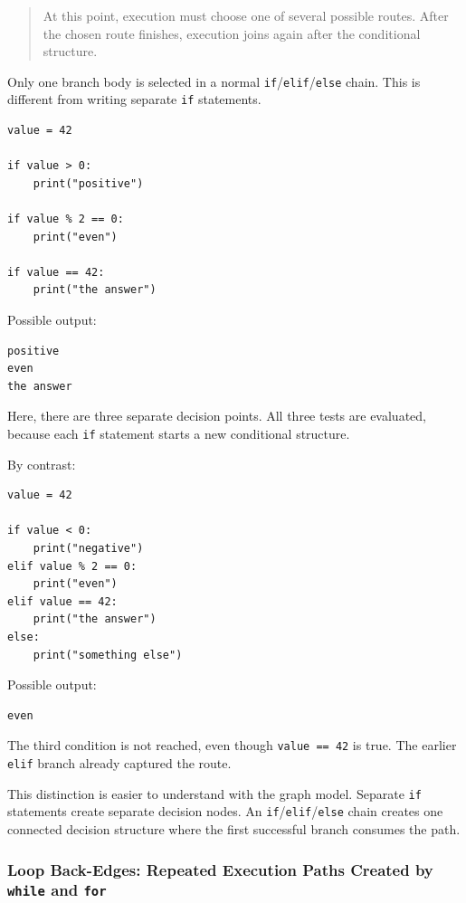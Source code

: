 \documentclass[a4paper,twoside]{report}
\begin{document}
\begin{quote}
At this point, execution must choose one of several possible routes. After the chosen route finishes, execution joins again after the conditional structure.
\end{quote}

Only one branch body is selected in a normal \texttt{if}/\texttt{elif}/\texttt{else} chain. This is different from writing separate \texttt{if} statements.

\begin{verbatim}
value = 42

if value > 0:
    print("positive")

if value % 2 == 0:
    print("even")

if value == 42:
    print("the answer")
\end{verbatim}

Possible output:

\begin{verbatim}
positive
even
the answer
\end{verbatim}

Here, there are three separate decision points. All three tests are evaluated, because each \texttt{if} statement starts a new conditional structure.

By contrast:

\begin{verbatim}
value = 42

if value < 0:
    print("negative")
elif value % 2 == 0:
    print("even")
elif value == 42:
    print("the answer")
else:
    print("something else")
\end{verbatim}

Possible output:

\begin{verbatim}
even
\end{verbatim}

The third condition is not reached, even though \texttt{value == 42} is true. The earlier \texttt{elif} branch already captured the route.

This distinction is easier to understand with the graph model. Separate \texttt{if} statements create separate decision nodes. An \texttt{if}/\texttt{elif}/\texttt{else} chain creates one connected decision structure where the first successful branch consumes the path.

\subsubsection{Loop Back-Edges: Repeated Execution Paths Created by \texttt{while} and \texttt{for}}
\end{document}
